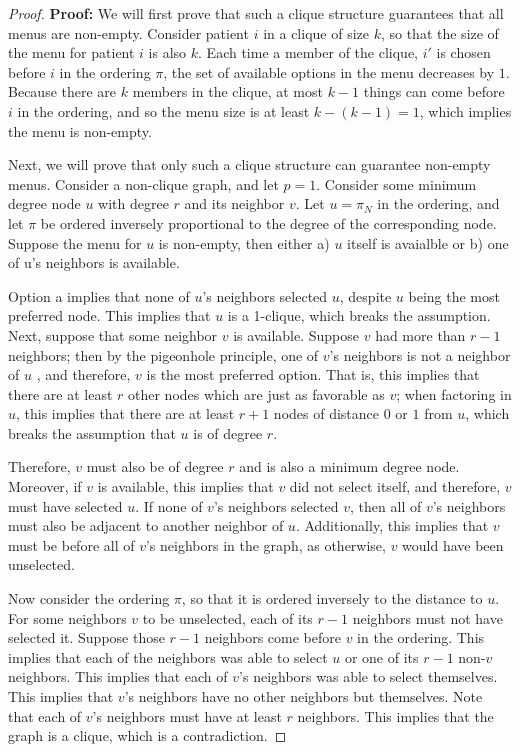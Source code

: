 \begin{proof}
    \textbf{Proof:} We will first prove that such a clique structure guarantees that all menus are non-empty.  
    Consider patient $i$ in a clique of size $k$, so that the size of the menu for patient $i$ is also $k$. 
    Each time a member of the clique, $i'$ is chosen before $i$ in the ordering $\pi$, the set of available options in the menu decreases by $1$. 
    Because there are $k$ members in the clique, at most $k-1$ things can come before $i$ in the ordering, and so the menu size is at least $k-(k-1) = 1$, which implies the menu is non-empty. 

    Next, we will prove that only such a clique structure can guarantee non-empty menus. 
    Consider a non-clique graph, and let $p=1$.
    Consider some minimum degree node $u$ with degree $r$ and its neighbor $v$. 
    Let $u = \pi_{N}$ in the ordering, and let $\pi$ be ordered inversely proportional to the degree of the corresponding node. 
    Suppose the menu for $u$ is non-empty, then either a) $u$ itself is avaialble or b) one of u's neighbors is available. 
    
    Option a implies that none of $u$'s neighbors selected $u$, despite $u$ being the most preferred node. 
    This implies that $u$ is a 1-clique, which breaks the assumption. 
    Next, suppose that some neighbor $v$ is available. 
    Suppose $v$ had more than $r-1$ neighbors; then by the pigeonhole principle, one of $v$'s neighbors is not a neighbor of $u$ , and therefore, $v$ is the most preferred option. 
    That is, this implies that there are at least $r$ other nodes which are just as favorable as $v$; when factoring in $u$, this implies that there are at least $r+1$ nodes of distance $0$ or $1$ from $u$, which breaks the assumption that $u$ is of degree $r$. 

    Therefore, $v$ must also be of degree $r$ and is also a minimum degree node. 
    Moreover, if $v$ is available, this implies that $v$ did not select itself, and therefore, $v$ must have selected $u$. 
    If none of $v$'s neighbors selected $v$, then all of $v$'s neighbors must also be adjacent to another neighbor of $u$. 
    Additionally, this implies that $v$ must be before all of $v$'s neighbors in the graph, as otherwise, $v$ would have been unselected. 

    Now consider the ordering $\pi$, so that it is ordered inversely to the distance to $u$. 
    For some neighbors $v$ to be unselected, each of its $r-1$ neighbors must not have selected it. 
    Suppose those $r-1$ neighbors come before $v$ in the ordering. 
    This implies that each of the neighbors was able to select $u$ or one of its $r-1$ non-$v$ neighbors. 
    This implies that each of $v$'s neighbors was able to select themselves. 
    This implies that $v$'s neighbors have no other neighbors but themselves. 
    Note that each of $v$'s neighbors must have at least $r$ neighbors. 
    This implies that the graph is a clique, which is a contradiction. 
\end{proof}

